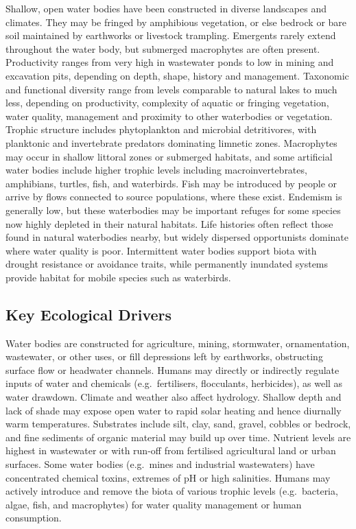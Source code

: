 \documentclass[
  letterpaper,
  DIV=11,
  numbers=noendperiod]{scrartcl}
\begin{document}
Shallow, open water bodies have been constructed in diverse landscapes
and climates. They may be fringed by amphibious vegetation, or else
bedrock or bare soil maintained by earthworks or livestock trampling.
Emergents rarely extend throughout the water body, but submerged
macrophytes are often present. Productivity ranges from very high in
wastewater ponds to low in mining and excavation pits, depending on
depth, shape, history and management. Taxonomic and functional diversity
range from levels comparable to natural lakes to much less, depending on
productivity, complexity of aquatic or fringing vegetation, water
quality, management and proximity to other waterbodies or vegetation.
Trophic structure includes phytoplankton and microbial detritivores,
with planktonic and invertebrate predators dominating limnetic zones.
Macrophytes may occur in shallow littoral zones or submerged habitats,
and some artificial water bodies include higher trophic levels including
macroinvertebrates, amphibians, turtles, fish, and waterbirds. Fish may
be introduced by people or arrive by flows connected to source
populations, where these exist. Endemism is generally low, but these
waterbodies may be important refuges for some species now highly
depleted in their natural habitats. Life histories often reflect those
found in natural waterbodies nearby, but widely dispersed opportunists
dominate where water quality is poor. Intermittent water bodies support
biota with drought resistance or avoidance traits, while permanently
inundated systems provide habitat for mobile species such as waterbirds.

\subsection{Key Ecological Drivers}\label{key-ecological-drivers-18}

Water bodies are constructed for agriculture, mining, stormwater,
ornamentation, wastewater, or other uses, or fill depressions left by
earthworks, obstructing surface flow or headwater channels. Humans may
directly or indirectly regulate inputs of water and chemicals
(e.g.~fertilisers, flocculants, herbicides), as well as water drawdown.
Climate and weather also affect hydrology. Shallow depth and lack of
shade may expose open water to rapid solar heating and hence diurnally
warm temperatures. Substrates include silt, clay, sand, gravel, cobbles
or bedrock, and fine sediments of organic material may build up over
time. Nutrient levels are highest in wastewater or with run-off from
fertilised agricultural land or urban surfaces. Some water bodies
(e.g.~mines and industrial wastewaters) have concentrated chemical
toxins, extremes of pH or high salinities. Humans may actively introduce
and remove the biota of various trophic levels (e.g.~bacteria, algae,
fish, and macrophytes) for water quality management or human
consumption.
\end{document}
